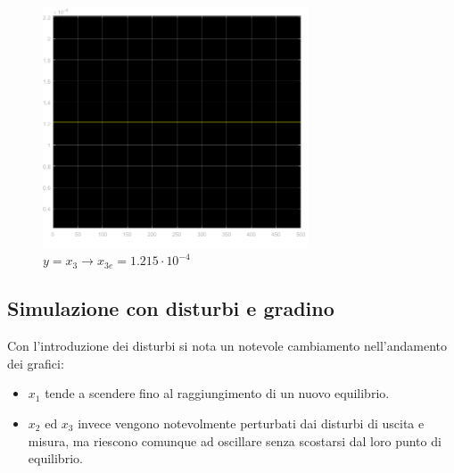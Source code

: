 \documentclass{article}
\begin{document}
\begin{figure}[!h]
    \centering
     \includegraphics[width=0.7\textwidth]{grafici/x3_1.png}
     \caption*{$y=x_3\longrightarrow x_{3e}=1.215\cdot10^{-4}$}
\end{figure}
\newpage
\noindent
\subsection{Simulazione con disturbi e gradino}
Con l'introduzione dei disturbi si nota un notevole cambiamento nell'andamento dei grafici:
\begin{itemize}
    \item $x_1$ tende a scendere fino al raggiungimento di un nuovo equilibrio.
    \item $x_2$ ed $x_3$ invece vengono notevolmente perturbati dai disturbi di uscita e misura, ma riescono comunque ad oscillare senza scostarsi dal loro punto di equilibrio.
\end{itemize}
\end{document}
